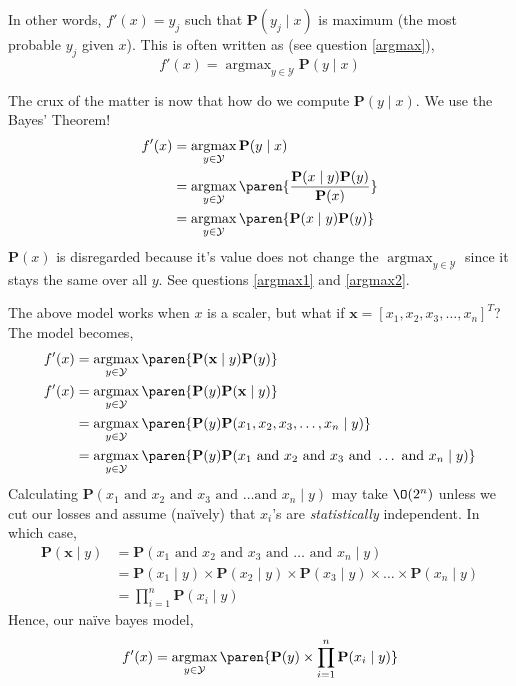 \documentclass{homework}
\renewcommand\P{\mathbf{P}}
\newcommand\Y{\mathcal{Y}}
\DeclareMathOperator*{\argmax}{argmax}
\begin{document}
In other words, $f'(x) = y_j$ such that $\P(y_j \mid x)$ is maximum
(the most probable $y_j$ given $x$). This is often written as (see
question \ref{argmax}),
\[
  f'(x) = \argmax_{y\in \Y}\P(y\mid x)
\]

The crux of the matter is now that how do we compute $\P(y\mid x)$. We
use the Bayes' Theorem!
\begin{align*}
  f'(x) & = \argmax_{y\in \Y}\P(y\mid x)                             \\
        & = \argmax_{y\in \Y}\paren{\frac{\P(x \mid y)\P(y)}{\P(x)}} \\
        & = \argmax_{y\in \Y}\paren{\P(x \mid y)\P(y)}
\end{align*}
$\P(x)$ is disregarded because it's value does not change the
$\argmax_{y\in \Y}$ since it stays the same over all $y$. See
questions \ref{argmax1} and \ref{argmax2}.

The above model works when $x$ is a scaler, but what if
$\mathbf{x} = [x_1, x_2, x_3, \hdots, x_n]^T$? The model becomes,
\begin{align*}
  f'(x) & = \argmax_{y\in \Y}\paren{\P(\mathbf{x} \mid y)\P(y)} \\
  f'(x) & = \argmax_{y\in \Y}\paren{\P(y)\P(\mathbf{x} \mid y)} \\
        & = \argmax_{y\in \Y}\paren{\P(y)\P(
  x_1, x_2, x_3, \hdots, x_n \mid y)}                           \\
        & = \argmax_{y\in \Y}\paren{\P(y)\P(
    x_1 \text{ and }
    x_2 \text{ and }
    x_3 \text{ and }
    \hdots \text{ and }
    x_n \mid y
    )}
\end{align*}
Calculating
$\P(x_1 \text{ and } x_2 \text{ and } x_3 \text{ and } \hdots \text{
    and } x_n \mid y)$ may take $\O(2^n)$ unless we cut our losses and
assume (na\"ively) that $x_i$'s are \textit{statistically}
independent. In which case,
\begin{align*}
  \P(\mathbf{x}\mid y)
   & = \P(
  x_1 \text{ and }
  x_2 \text{ and }
  x_3 \text{ and }
  \hdots \text{ and }
  x_n \mid y)                      \\
   & = \P(x_1 \mid y) \times
  \P(x_2 \mid y) \times
  \P(x_3 \mid y) \times
  \hdots \times
  \P(x_n \mid y)                   \\
   & = \prod_{i=1}^n\P(x_i \mid y)
\end{align*}
Hence, our na\"ive bayes model,
\[
  f'(x) = \argmax_{y\in \Y}\paren{\P(y) \times \prod_{i=1}^n\P(x_i \mid y)}
\]
\end{document}
